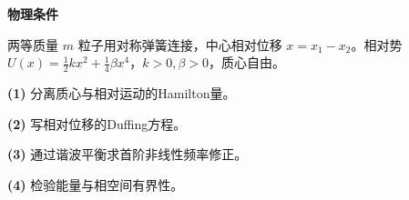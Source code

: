 \textbf{物理条件}\par 两等质量 \(m\) 粒子用对称弹簧连接，中心相对位移 \(x=x_1-x_2\)。相对势 \(U(x)=\frac12kx^2+\frac14\beta x^4\)，\(k>0,\beta>0\)，质心自由。
\par\noindent\textbf{(1)} 分离质心与相对运动的Hamilton量。
\par\noindent\textbf{(2)} 写相对位移的Duffing方程。
\par\noindent\textbf{(3)} 通过谐波平衡求首阶非线性频率修正。
\par\noindent\textbf{(4)} 检验能量与相空间有界性。
